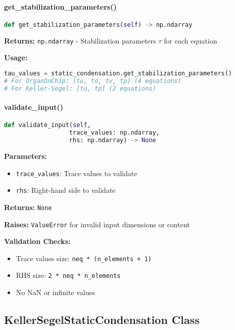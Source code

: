 \paragraph{get\_stabilization\_parameters()}\leavevmode
\begin{lstlisting}[language=Python, caption=Get Stabilization Parameters Method]
def get_stabilization_parameters(self) -> np.ndarray
\end{lstlisting}

\textbf{Returns:} \texttt{np.ndarray} - Stabilization parameters $\tau$ for each equation

\textbf{Usage:}
\begin{lstlisting}[language=Python, caption=Get Stabilization Usage]
tau_values = static_condensation.get_stabilization_parameters()
# For OrganOnChip: [tu, to, tv, tp] (4 equations)
# For Keller-Segel: [tu, tp] (2 equations)
\end{lstlisting}

\paragraph{validate\_input()}\leavevmode
\begin{lstlisting}[language=Python, caption=Validate Input Method]
def validate_input(self, 
                  trace_values: np.ndarray, 
                  rhs: np.ndarray) -> None
\end{lstlisting}

\textbf{Parameters:}
\begin{itemize}
    \item \texttt{trace\_values}: Trace values to validate
    \item \texttt{rhs}: Right-hand side to validate
\end{itemize}

\textbf{Returns:} \texttt{None}

\textbf{Raises:} \texttt{ValueError} for invalid input dimensions or content

\textbf{Validation Checks:}
\begin{itemize}
    \item Trace values size: \texttt{neq * (n\_elements + 1)}
    \item RHS size: \texttt{2 * neq * n\_elements}
    \item No NaN or infinite values
\end{itemize}

\subsection{KellerSegelStaticCondensation Class}
\label{subsec:keller_segel_static_condensation}

